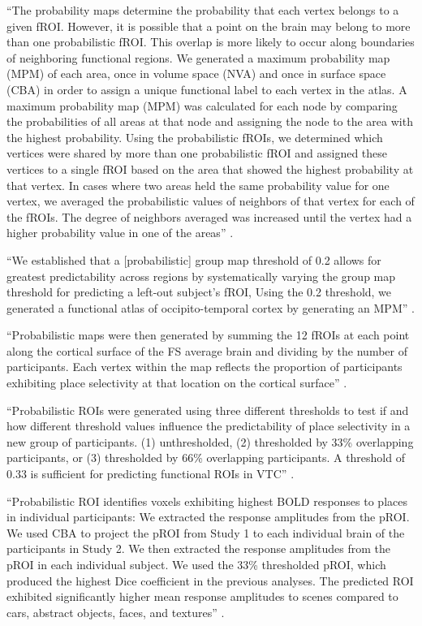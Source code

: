 ``The probability maps determine the probability that each vertex belongs to a
given fROI.
%
However, it is possible that a point on the brain may belong to more than one
probabilistic fROI.
%
This overlap is more likely to occur along boundaries of neighboring functional
regions.
%
We generated a maximum probability map (MPM) of each area, once in volume space
(NVA) and once in surface space (CBA) in order to assign a unique functional
label to each vertex in the atlas.
%
A maximum probability map (MPM) was calculated for each node by comparing the
probabilities of all areas at that node and assigning the node to the area with
the highest probability.
%
Using the probabilistic fROIs, we determined which vertices were shared by more
than one probabilistic fROI and assigned these vertices to a single fROI based
on the area that showed the highest probability at that vertex.
%
In cases where two areas held the same probability value for one vertex, we
averaged the probabilistic values of neighbors of that vertex for each of the
fROIs.
%
The degree of neighbors averaged was increased until the vertex had a higher
probability value in one of the areas'' \citep{rosenke2021probabilistic}.

``We established that a [probabilistic] group map threshold of 0.2 allows for
greatest predictability across regions by systematically varying the group map
threshold for predicting a left-out subject's fROI,
%
Using the 0.2 threshold, we generated a functional atlas of occipito-temporal
cortex by generating an MPM'' \citep{rosenke2021probabilistic}.






``Probabilistic maps were then generated by summing the 12 fROIs at each point
along the cortical surface of the FS average brain and dividing by the number of
participants.
%
Each vertex within the map reflects the proportion of participants exhibiting
place selectivity at that location on the cortical surface''
\citep{weiner2018defining}.

``Probabilistic ROIs were generated using three different thresholds to test if
and how different threshold values influence the predictability of place
selectivity in a new group of participants.
%
(1) unthresholded,
%
(2) thresholded by 33\% overlapping participants, or
%
(3) thresholded by 66\% overlapping participants.
%
A threshold of 0.33 is sufficient for predicting functional ROIs in VTC''
\citep{weiner2018defining}.

``Probabilistic ROI identifies voxels exhibiting highest BOLD responses to
places in individual participants:
%
We extracted the response amplitudes from the pROI.
%
We used CBA to project the pROI from Study 1 to each individual brain of the
participants in Study 2.
%
We then extracted the response amplitudes from the pROI in each individual
subject.
%
We used the 33\% thresholded pROI, which produced the highest Dice coefficient
in the previous analyses.
%
The predicted ROI exhibited significantly higher mean response amplitudes to
scenes compared to cars, abstract objects, faces, and textures''
\citep{weiner2018defining}.


